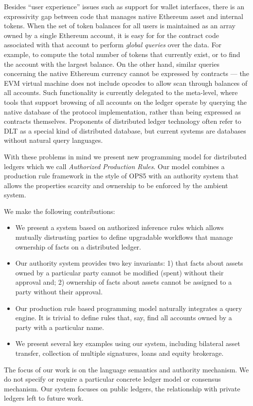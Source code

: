 Besides ``user experience'' issues such as support for wallet interfaces, there is an expressivity gap between code that manages native Ethereum asset and internal tokens. When the set of token balances for all users is maintained as an array owned by a single Ethereum account, it is easy for for the contract code associated with that account to perform \emph{global queries} over the data. For example, to compute the total number of tokens that currently exist, or to find the account with the largest balance. On the other hand, similar queries concerning the native Ethereum currency cannot be expressed by contracts --- the EVM virtual machine does not include opcodes to allow scan through balances of all accounts. Such functionality is currently delegated to the meta-level, where tools that support browsing of all accounts on the ledger operate by querying the native database of the protocol implementation, rather than being expressed as contracts themselves. Proponents of distributed ledger technology often refer to DLT as a special kind of distributed database, but current systems are databases without natural query languages.

With these problems in mind we present new programming model for distributed ledgers which we call \emph{Authorized Production Rules}. Our model combines a production rule framework in the style of OPS5 with an authority system that allows the properties scarcity and ownership to be enforced by the ambient system.

We make the following contributions:

\begin{itemize}
\item We present a system based on authorized inference rules which allows mutually distrusting parties to define upgradable workflows that manage ownership of facts on a distributed ledger.

\item Our authority system provides two key invariants: 1) that facts about assets owned by a particular party cannot be modified (spent) without their approval and; 2) ownership of facts about assets cannot be assigned to a party without their approval.

\item Our production rule based programming model naturally integrates a query engine. It is trivial to define rules that, say, find all accounts owned by a party with a particular name.

\item We present several key examples using our system, including bilateral asset transfer, collection of multiple signatures, loans and equity brokerage.
\end{itemize}

The focus of our work is on the language semantics and authority mechanism. We do not specify or require a particular concrete ledger model or consensus mechanism. Our system focuses on public ledgers, the relationship with private ledgers left to future work.

